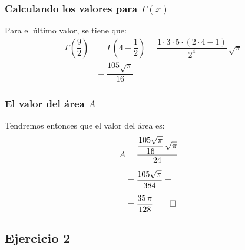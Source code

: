 \begin{frame}
\frametitle{Calculando los valores para $\Gamma (x)$}
Para el último valor, se tiene que:
\begin{align*}
\Gamma \left( \dfrac{9}{2}\right) &=  \Gamma \left(4 + \dfrac{1}{2}\right) = \dfrac{1 \cdot 3 \cdot 5 \cdot (2 \cdot 4 - 1)}{2^{4}} \, \sqrt{\pi} \\[1em]
&= \dfrac{105 \sqrt{\pi}}{16}
\end{align*}
\end{frame}
\begin{frame}
\frametitle{El valor del área $A$}
Tendremos entonces que el valor del área es:
\begin{align*}
A &= \dfrac{\dfrac{105 \sqrt{\pi}}{16} \, \sqrt{\pi}}{24} = \\[0.5em]
&= \dfrac{105 \sqrt{\pi}}{384} = \\[0.5em]
&= \dfrac{35 \, \pi}{128} \qed
\end{align*}
\end{frame}

\subsection{Ejercicio 2}

